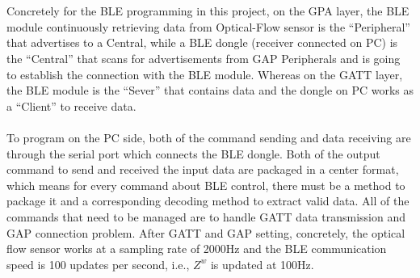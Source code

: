 \\\\%
Concretely for the BLE programming in this project, on the GPA layer, the BLE module continuously retrieving data from Optical-Flow sensor is the \enquote{Peripheral} that advertises to a Central, while a BLE dongle (receiver connected on PC) is the \enquote{Central} that scans for advertisements from GAP Peripherals and is going to establish the connection with the BLE module. Whereas on the GATT layer, the BLE module is the \enquote{Sever} that contains data and the dongle on PC works as a \enquote{Client} to receive data.
\\\\%
To program on the PC side, both of the command sending and data receiving are through the serial port which connects the BLE dongle. Both of the output command to send and received the input data are packaged in a center format, which means for every command about BLE control, there must be a method to package it and a corresponding decoding method to extract valid data. All of the commands that need to be managed are to handle GATT data transmission and GAP connection problem. After GATT and GAP setting, concretely, the optical flow sensor works at a sampling rate of 2000Hz and the BLE communication speed is 100 updates per second, i.e., \(Z^w\) is updated at 100Hz.
%
%
